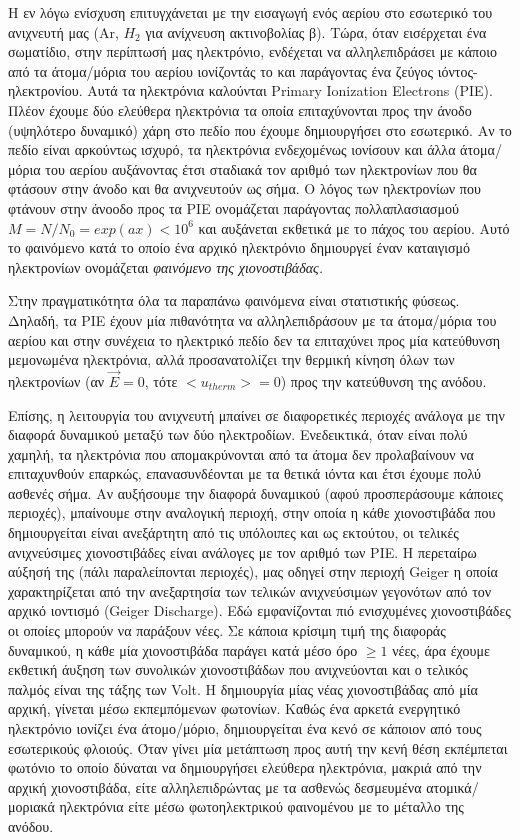 \documentclass[a4paper]{article}
\begin{document}
	Η εν λόγω ενίσχυση επιτυγχάνεται με την εισαγωγή ενός αερίου στο εσωτερικό του ανιχνευτή μας (Ar, $H_2$ για ανίχνευση ακτινοβολίας β).
	 Τώρα, όταν εισέρχεται ένα σωματίδιο, στην περίπτωσή μας ηλεκτρόνιο, ενδέχεται να αλληλεπιδράσει με κάποιο από τα άτομα/μόρια του αερίου ιονίζοντάς το και παράγοντας ένα ζεύγος ιόντος-ηλεκτρονίου. Αυτά τα ηλεκτρόνια καλούνται Primary Ionization Electrons (PIE). Πλέον έχουμε δύο ελεύθερα ηλεκτρόνια τα οποία επιταχύνονται προς την άνοδο (υψηλότερο δυναμικό) χάρη στο πεδίο που έχουμε δημιουργήσει στο εσωτερικό. Αν το πεδίο είναι αρκούντως ισχυρό, τα ηλεκτρόνια ενδεχομένως ιονίσουν και άλλα άτομα/μόρια του αερίου αυξάνοντας έτσι σταδιακά τον αριθμό των ηλεκτρονίων που θα φτάσουν στην άνοδο και θα ανιχνευτούν ως σήμα. Ο λόγος των ηλεκτρονίων που φτάνουν στην άνοοδο προς τα PIE ονομάζεται παράγοντας πολλαπλασιασμού $M=N/N_0=exp(ax) < 10^6$ και αυξάνεται εκθετικά με το πάχος του αερίου. Αυτό το φαινόμενο κατά το οποίο ένα αρχικό ηλεκτρόνιο δημιουργεί έναν καταιγισμό ηλεκτρονίων ονομάζεται \textit{φαινόμενο της χιονοστιβάδας.}
	
	Στην πραγματικότητα όλα τα παραπάνω φαινόμενα είναι στατιστικής φύσεως. Δηλαδή, τα PIE έχουν μία πιθανότητα να αλληλεπιδράσουν με τα άτομα/μόρια του αερίου και στην συνέχεια το ηλεκτρικό πεδίο δεν τα επιταχύνει προς μία κατεύθυνση μεμονωμένα ηλεκτρόνια, αλλά προσανατολίζει την θερμική κίνηση όλων των ηλεκτρονίων (αν $\vec{Ε}=0$, τότε $<u_{therm}> =0$) προς την κατεύθυνση της ανόδου.
	
	Επίσης, η λειτουργία του ανιχνευτή μπαίνει σε διαφορετικές περιοχές ανάλογα με την διαφορά δυναμικού μεταξύ των δύο ηλεκτροδίων. Ενεδεικτικά, όταν είναι πολύ χαμηλή, τα ηλεκτρόνια που απομακρύνονται από τα άτομα δεν προλαβαίνουν να επιταχυνθούν επαρκώς, επανασυνδέονται με τα θετικά ιόντα και έτσι έχουμε πολύ ασθενές σήμα. Αν αυξήσουμε την διαφορά δυναμικού (αφού προσπεράσουμε κάποιες περιοχές), μπαίνουμε στην αναλογική περιοχή, στην οποία η κάθε χιονοστιβάδα που δημιουργείται είναι ανεξάρτητη από τις υπόλοιπες και ως εκτούτου, οι τελικές ανιχνεύσιμες χιονοστιβάδες είναι ανάλογες με τον αριθμό των PIE. Η περεταίρω αύξησή της (πάλι παραλείπονται περιοχές), μας οδηγεί στην περιοχή Geiger η οποία χαρακτηρίζεται από την ανεξαρτησία των τελικών ανιχνεύσιμων γεγονότων από τον αρχικό ιοντισμό (Geiger Discharge). 
	Εδώ εμφανίζονται πιό ενισχυμένες χιονοστιβάδες οι οποίες μπορούν να παράξουν νέες. Σε κάποια κρίσιμη τιμή της διαφοράς δυναμικού, η κάθε μία χιονοστιβάδα παράγει κατά μέσο όρο $\geq 1$ νέες, άρα έχουμε εκθετική άυξηση των συνολικών χιονοστιβάδων που ανιχνεύονται και ο τελικός παλμός είναι της τάξης των Volt. 
	Η δημιουργία μίας νέας χιονοστιβάδας από μία αρχική, γίνεται μέσω εκπεμπόμενων φωτονίων. Καθώς ένα αρκετά ενεργητικό ηλεκτρόνιο ιονίζει ένα άτομο/μόριο, δημιουργείται ένα κενό σε κάποιον από τους εσωτερικούς φλοιούς. 
	Όταν γίνει μία μετάπτωση προς αυτή την κενή θέση εκπέμπεται φωτόνιο το οποίο δύναται να δημιουργήσει ελεύθερα ηλεκτρόνια, μακριά από την αρχική χιονοστιβάδα, είτε αλληλεπιδρώντας με τα ασθενώς δεσμευμένα ατομικά/μοριακά ηλεκτρόνια είτε μέσω φωτοηλεκτρικού φαινομένου με το μέταλλο της ανόδου.
	
\end{document}
